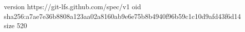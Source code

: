 version https://git-lfs.github.com/spec/v1
oid sha256:a7ae7e36b8808a123aa02a8160ab9e6e75b8b4940f96b59c1c10d9afd43f6d14
size 520
